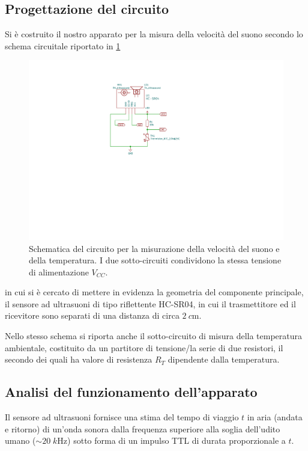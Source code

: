 \documentclass[10pt, a4paper, italian]{article}
\begin{document}
\subsection{Progettazione del circuito}
Si è costruito il nostro apparato per la misura della velocità del suono
secondo lo schema circuitale riportato in \cref{schm: mesctrl}
\begin{figure}[htbp]
    \centering
	\includegraphics[scale=1]{schm}
    \caption{Schematica del circuito per la misurazione della velocità del
    suono e della temperatura. I due sotto-circuiti condividono la stessa
    tensione di alimentazione $V_{CC}$.
    \label{schm: mesctrl}}
\end{figure}

in cui si è cercato di mettere in evidenza la geometria del componente
principale, il sensore ad ultrasuoni di tipo riflettente HC-SR04, in cui
il trasmettitore ed il ricevitore sono separati di una distanza di circa
$\SI{2}{c\m}$.

Nello stesso schema si riporta anche il sotto-circuito di misura della
temperatura ambientale, costituito da un partitore di tensione/la
serie di due resistori, il secondo dei quali ha valore di resistenza $R_T$
dipendente dalla temperatura.

\subsection{Analisi del funzionamento dell'apparato}
Il sensore ad ultrasuoni fornisce una stima del tempo di viaggio $t$ in aria
(andata e ritorno) di un'onda sonora dalla frequenza superiore alla soglia
dell'udito umano ($\sim 20 \; \si{k\Hz}$) sotto forma di un impulso TTL di
durata proporzionale a $t$.
\end{document}
